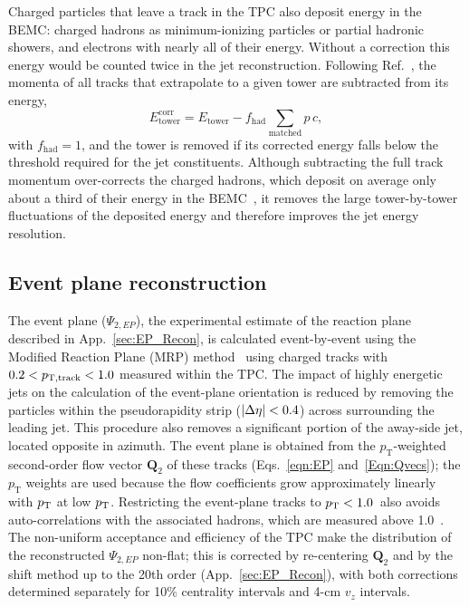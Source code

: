 Charged particles that leave a track in the TPC also deposit energy in the BEMC: charged hadrons as minimum-ionizing particles or partial hadronic showers, and electrons with nearly all of their energy.
%
Without a correction this energy would be counted twice in the jet reconstruction.
%
Following Ref.~\cite{STAR:2021lvw}, the momenta of all tracks that extrapolate to a given tower are subtracted from its energy,
%
\begin{equation}
	E_\mathrm{tower}^\mathrm{corr} = E_\mathrm{tower} - f_\mathrm{had} \sum_{\mathrm{matched}} p\,c,
	\label{Eq:HadCorr}
\end{equation}
%
with $f_\mathrm{had} = 1$, and the tower is removed if its corrected energy falls below the threshold required for the jet constituents.
%
Although subtracting the full track momentum over-corrects the charged hadrons, which deposit on average only about a third of their energy in the BEMC~\cite{STAR:2019yqm}, it removes the large tower-by-tower fluctuations of the deposited energy and therefore improves the jet energy resolution.

\subsection{Event plane reconstruction} \label{sec:EPReco}
The event plane (\(\Psi_{2,EP}\)), the experimental estimate of the reaction plane described in App.~\ref{sec:EP_Recon}, is calculated event-by-event using the Modified Reaction Plane (MRP) method~\cite{CASTILHO2018369,Agakishiev:2014ada,Adams_2005} using charged tracks with $0.2 < p_{\rm  T, track} < 1.0$ \GeVc measured within the TPC.  
%
The impact of highly energetic jets on the calculation of the event-plane orientation is reduced by removing the particles within the pseudorapidity strip ($|\Delta\eta|<0.4$) across \dphi surrounding the leading jet.  
%
This procedure also removes a significant portion of the away-side jet, located opposite in azimuth. 
%
The event plane is obtained from the $p_\mathrm{T}$-weighted second-order flow vector $\mathbf{Q}_2$ of these tracks (Eqs.~\ref{eqn:EP} and~\ref{Eqn:Qvecs}); the $p_\mathrm{T}$ weights are used because the flow coefficients grow approximately linearly with \ensuremath{p_{\rm T}}\xspace at low \ensuremath{p_{\rm T}}\xspace.
%
Restricting the event-plane tracks to $\ensuremath{p_{\rm T}}\xspace < 1.0$~\GeVc also avoids auto-correlations with the associated hadrons, which are measured above 1.0~\GeVc.
%
The non-uniform acceptance and efficiency of the TPC make the distribution of the reconstructed $\Psi_{2,EP}$ non-flat; this is corrected by re-centering $\mathbf{Q}_2$ and by the shift method up to the 20th order (App.~\ref{sec:EP_Recon}), with both corrections determined separately for 10\% centrality intervals and 4-cm $v_z$ intervals.
%

